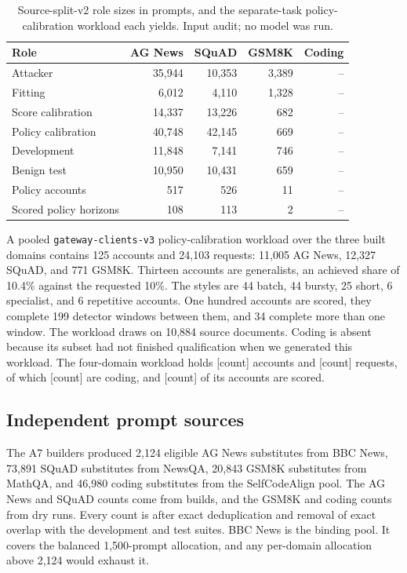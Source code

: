 \documentclass[journal]{IEEEtran}
\newcommand{\tbd}[1]{\textcolor{red!65!black}{[#1]}}
\newcommand{\pending}{\textcolor{red!65!black}{--}}
\begin{document}
\begin{table}[!t]
\centering\footnotesize
\caption{Source-split-v2 role sizes in prompts, and the separate-task policy-calibration workload each yields. Input audit; no model was run.}
\label{tab:roles}
\begin{tabularx}{\columnwidth}{@{}Yrrrr@{}}\toprule
Role & AG News & SQuAD & GSM8K & Coding \\\midrule
Attacker & 35,944 & 10,353 & 3,389 & \pending \\
Fitting & 6,012 & 4,110 & 1,328 & \pending \\
Score calibration & 14,337 & 13,226 & 682 & \pending \\
Policy calibration & 40,748 & 42,145 & 669 & \pending \\
Development & 11,848 & 7,141 & 746 & \pending \\
Benign test & 10,950 & 10,431 & 659 & \pending \\\midrule
Policy accounts & 517 & 526 & 11 & \pending \\
Scored policy horizons & 108 & 113 & 2 & \pending \\\bottomrule
\end{tabularx}
\end{table}

A pooled \texttt{gateway-clients-v3} policy-calibration workload over the three built domains contains 125 accounts and 24,103 requests: 11,005 AG News, 12,327 SQuAD, and 771 GSM8K. Thirteen accounts are generalists, an achieved share of 10.4\% against the requested 10\%. The styles are 44 batch, 44 bursty, 25 short, 6 specialist, and 6 repetitive accounts. One hundred accounts are scored, they complete 199 detector windows between them, and 34 complete more than one window. The workload draws on 10,884 source documents. Coding is absent because its subset had not finished qualification when we generated this workload. The four-domain workload holds \tbd{count} accounts and \tbd{count} requests, of which \tbd{count} are coding, and \tbd{count} of its accounts are scored.

\subsection{Independent prompt sources}
The A7 builders produced 2,124 eligible AG News substitutes from BBC News, 73,891 SQuAD substitutes from NewsQA, 20,843 GSM8K substitutes from MathQA, and 46,980 coding substitutes from the SelfCodeAlign pool. The AG News and SQuAD counts come from builds, and the GSM8K and coding counts from dry runs. Every count is after exact deduplication and removal of exact overlap with the development and test suites. BBC News is the binding pool. It covers the balanced 1,500-prompt allocation, and any per-domain allocation above 2,124 would exhaust it.
\end{document}
